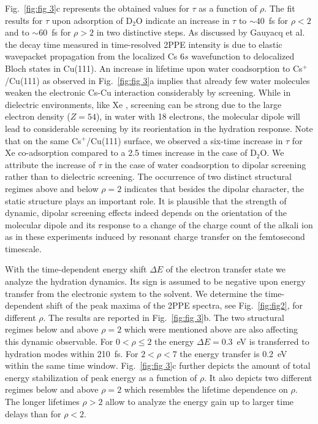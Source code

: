\documentclass[aps,twocolumn,amssymb,amsfonts,amsmath,showpacs,final,a4paper,superscriptaddress]{revtex4-2}
\begin{document}
Fig.~\ref{fig:fig 3}c represents the obtained values for $\tau$ as a function of $\rho$. The fit results for $\tau$ upon adsorption of D$_2$O indicate an increase in $\tau$ to $\sim40$~fs for $\rho<2$ and to $\sim60$~fs for $\rho>2$ in two distinctive steps. As discussed by Gauyacq et al. \cite{gauyacq_2007} the decay time measured in time-resolved 2PPE intensity is due to elastic wavepacket propagation from the localized Cs $6s$ wavefunction to delocalized Bloch states in Cu(111). An increase in lifetime upon water coadsorption to Cs$^+$/Cu(111) as observed in Fig.~\ref{fig:fig 3}a implies that already few water molecules weaken the electronic Cs-Cu interaction considerably by screening. While in dielectric environments, like Xe \cite{thomas_2021}, screening can be strong due to the large electron density ($Z=54$), in water with 18 electrons, the molecular dipole will lead to considerable screening by its reorientation in the hydration response. Note that  on the same Cs$^+$/Cu(111) surface, we observed a six-time increase in $\tau$ for Xe co-adsorption compared to a 2.5 times increase in the case of D$_2$O. We attribute the increase of $\tau$ in the case of water coadsorption to dipolar screening rather than to dielectric screening. The occurrence of two distinct structural regimes above and below $\rho=2$ indicates that besides the dipolar character, the static structure plays an important role. It is plausible that the strength of dynamic, dipolar screening effects indeed depends on the orientation of the molecular dipole and its response to a change of the charge count of the alkali ion as in these experiments induced by resonant charge transfer on the femtosecond timescale.

With the time-dependent energy shift $\Delta E$ of the electron transfer state we analyze the hydration dynamics. Its sign is assumed to be negative upon energy transfer from the electronic system to the solvent. We determine the time-dependent shift of the peak maxima of the 2PPE spectra, see Fig.~\ref{fig:fig2}, for different $\rho$. The results are reported in Fig.~\ref{fig:fig 3}b. The two structural regimes below and above $\rho=2$ which were mentioned above are also affecting this dynamic observable. For $0<\rho \leq 2$ the energy $\Delta E = 0.3$~eV is transferred to hydration modes within 210~fs. For $2<\rho<7$ the energy transfer is 0.2~eV within the same time window. Fig.~\ref{fig:fig 3}c further depicts the amount of total energy stabilization of peak energy as a function of $\rho$. It also depicts two different regimes below and above $\rho=2$ which resembles the lifetime dependence on $\rho$. The longer lifetimes $\rho>2$ allow to analyze the energy gain up to larger time delays than for $\rho<2$.
\end{document}
